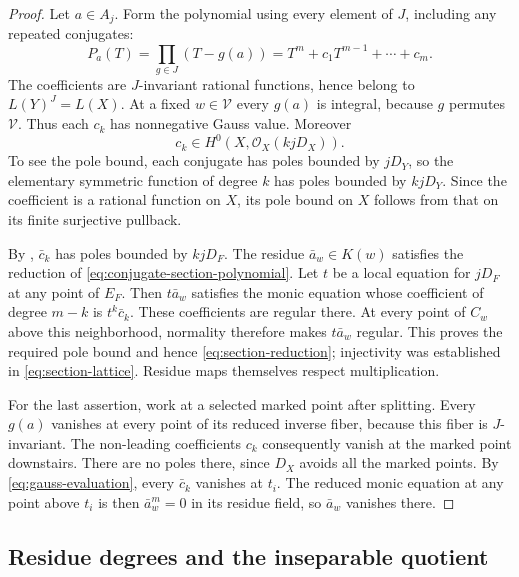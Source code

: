 \begin{proof}
Let $a\in A_j$. Form the polynomial using every element of $J$,
including any repeated conjugates:
\begin{equation}\label{eq:conjugate-section-polynomial}
 P_a(T)=\prod_{g\in J}(T-g(a))
       =T^m+c_1T^{m-1}+\cdots+c_m.
\end{equation}
The coefficients are $J$-invariant rational functions, hence belong to
$L(Y)^J=L(X)$. At a fixed $w\in\mathcal V$ every
$g(a)$ is integral, because $g$ permutes $\mathcal V$. Thus each $c_k$
has nonnegative Gauss value. Moreover
\[
 c_k\in H^0(X,\mathcal O_X(kjD_X)).
\]
To see the pole bound, each conjugate has poles bounded by $jD_Y$, so
the elementary symmetric function of degree $k$ has poles bounded by
$kjD_Y$. Since the coefficient is a rational function on $X$, its
pole bound on $X$ follows from that on its finite surjective pullback.

By , $\bar c_k$ has poles bounded by
$kjD_F$. The residue $\bar a_w\in K(w)$ satisfies the reduction of
\eqref{eq:conjugate-section-polynomial}. Let $t$ be a local equation for
$jD_F$ at any point of $E_F$. Then $t\bar a_w$ satisfies the monic
equation whose coefficient of degree $m-k$ is $t^k\bar c_k$.
These coefficients are regular there. At every point of $C_w$ above
this neighborhood, normality therefore makes $t\bar a_w$ regular.
This proves the required pole bound and hence
\eqref{eq:section-reduction}; injectivity was established in
\eqref{eq:section-lattice}. Residue maps themselves respect multiplication.

For the last assertion, work at a selected marked point after splitting.
Every $g(a)$ vanishes at every point of its reduced inverse fiber,
because this fiber is $J$-invariant. The non-leading coefficients
$c_k$ consequently vanish at the marked point downstairs. There are
no poles there, since $D_X$ avoids all the marked points.
By \eqref{eq:gauss-evaluation}, every $\bar c_k$ vanishes at $t_i$.
The reduced monic equation at any point above $t_i$ is then
$\bar a_w^m=0$ in its residue field, so $\bar a_w$ vanishes there.
\end{proof}

\subsection{Residue degrees and the inseparable quotient}

